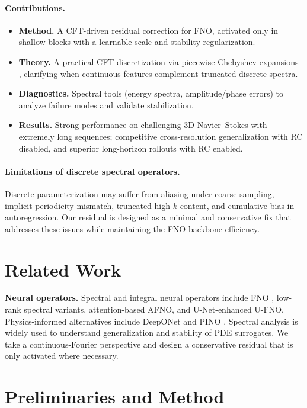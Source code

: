 \documentclass[11pt]{article}
\begin{document}
\paragraph{Contributions.}
\begin{itemize}
  \item \textbf{Method.} A CFT-driven residual correction for FNO, activated only in shallow blocks with a learnable scale and stability regularization.
  \item \textbf{Theory.} A practical CFT discretization via piecewise Chebyshev expansions \citep{barnett2010conformal}, clarifying when continuous features complement truncated discrete spectra.
  \item \textbf{Diagnostics.} Spectral tools (energy spectra, amplitude/phase errors) to analyze failure modes and validate stabilization.
  \item \textbf{Results.} Strong performance on challenging 3D Navier--Stokes with extremely long sequences; competitive cross-resolution generalization with RC disabled, and superior long-horizon rollouts with RC enabled.
\end{itemize}

\paragraph{Limitations of discrete spectral operators.} Discrete parameterization may suffer from aliasing under coarse sampling, implicit periodicity mismatch, truncated high-$k$ content, and cumulative bias in autoregression. Our residual is designed as a minimal and conservative fix that addresses these issues while maintaining the FNO backbone efficiency.

\section{Related Work}
\textbf{Neural operators.} Spectral and integral neural operators include FNO \citep{Li2020FNO}, low-rank spectral variants, attention-based AFNO, and U-Net-enhanced U-FNO. Physics-informed alternatives include DeepONet and PINO \citep{lu2021learning}. Spectral analysis is widely used to understand generalization and stability of PDE surrogates. We take a continuous-Fourier perspective and design a conservative residual that is only activated where necessary.

\section{Preliminaries and Method}
\end{document}
